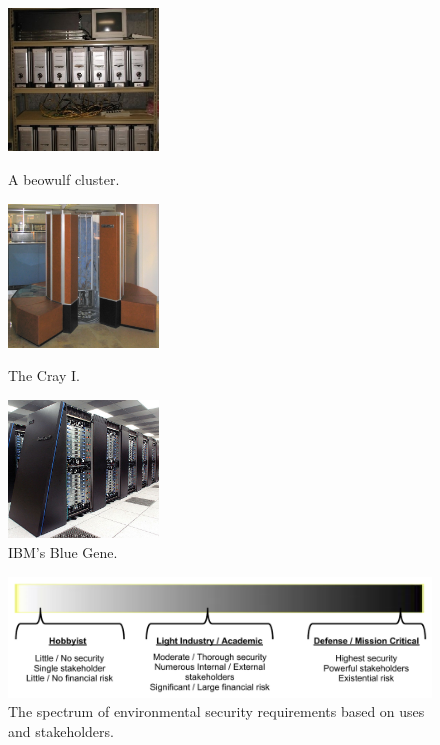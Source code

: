 \documentclass[oneside,12pt]{memoir}
\begin{document}
\begin{figure}
\centering
\begin{minipage}{4cm}
\includegraphics[width=4cm]{beowulf.jpg}
\caption{A beowulf cluster.~\cite{beowulf}}
\label{fig:beowulf}
\end{minipage}
\hspace{1em}
\begin{minipage}{4cm}
\includegraphics[width=4cm]{crayi.jpg}
\caption{The Cray I.~\cite{crayi}}
\label{fig:crayi}
\end{minipage}
\hspace{1em}
\begin{minipage}{4cm}
\includegraphics[width=4cm]{blue_gene.jpg}
\caption{IBM's Blue Gene.~\cite{blue_gene}}
\label{fig:blue_gene}
\end{minipage}
\end{figure}

\begin{figure}
\centering
\includegraphics[scale=0.6]{security_spectrum.pdf}
\caption{The spectrum of environmental security requirements based on uses and stakeholders.}
\label{fig:security_spectrum}
\end{figure}
\end{document}
